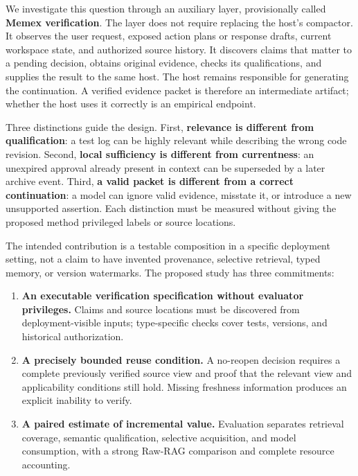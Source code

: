 \documentclass[
  11pt,
  a4paper,
]{article}
\providecommand{\tightlist}{%
  \setlength{\itemsep}{0pt}\setlength{\parskip}{0pt}}
\begin{document}
We investigate this question through an auxiliary layer, provisionally
called \textbf{Memex verification}. The layer does not require replacing
the host's compactor. It observes the user request, exposed action plans
or response drafts, current workspace state, and authorized source
history. It discovers claims that matter to a pending decision, obtains
original evidence, checks its qualifications, and supplies the result to
the same host. The host remains responsible for generating the
continuation. A verified evidence packet is therefore an intermediate
artifact; whether the host uses it correctly is an empirical endpoint.

Three distinctions guide the design. First, \textbf{relevance is
different from qualification}: a test log can be highly relevant while
describing the wrong code revision. Second, \textbf{local sufficiency is
different from currentness}: an unexpired approval already present in
context can be superseded by a later archive event. Third, \textbf{a
valid packet is different from a correct continuation}: a model can
ignore valid evidence, misstate it, or introduce a new unsupported
assertion. Each distinction must be measured without giving the proposed
method privileged labels or source locations.

The intended contribution is a testable composition in a specific
deployment setting, not a claim to have invented provenance, selective
retrieval, typed memory, or version watermarks. The proposed study has
three commitments:

\begin{enumerate}
\def\labelenumi{\arabic{enumi}.}
\tightlist
\item
  \textbf{An executable verification specification without evaluator
  privileges.} Claims and source locations must be discovered from
  deployment-visible inputs; type-specific checks cover tests, versions,
  and historical authorization.
\item
  \textbf{A precisely bounded reuse condition.} A no-reopen decision
  requires a complete previously verified source view and proof that the
  relevant view and applicability conditions still hold. Missing
  freshness information produces an explicit inability to verify.
\item
  \textbf{A paired estimate of incremental value.} Evaluation separates
  retrieval coverage, semantic qualification, selective acquisition, and
  model consumption, with a strong Raw-RAG comparison and complete
  resource accounting.
\end{enumerate}
\end{document}
